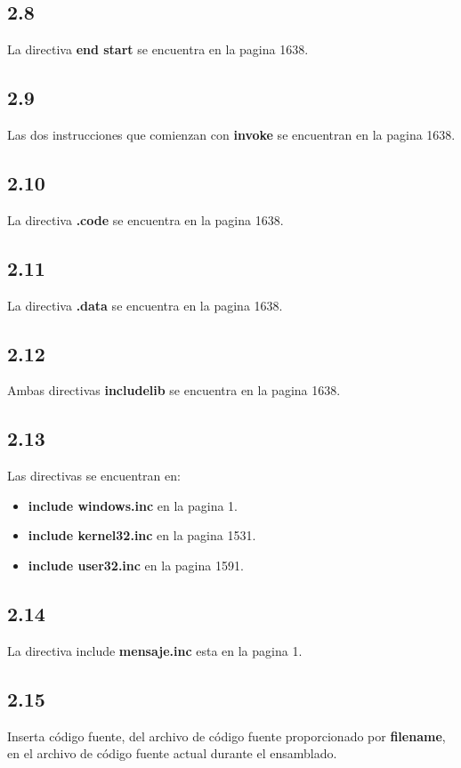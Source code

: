 \subsection*{2.8}
La directiva \textbf{end start} se encuentra en la pagina 1638.

\subsection*{2.9}
Las dos instrucciones que comienzan con \textbf{invoke} se encuentran en la pagina 1638.

\subsection*{2.10}
La directiva \textbf{.code} se encuentra en la pagina 1638.

\subsection*{2.11}
La directiva \textbf{.data} se encuentra en la pagina 1638.

\subsection*{2.12}
Ambas directivas \textbf{includelib} se encuentra en la pagina 1638.

\subsection*{2.13}
Las directivas se encuentran en:

\begin{itemize}
    \item \textbf{include windows.inc} en la pagina 1.
    \item \textbf{include kernel32.inc} en la pagina 1531.
    \item \textbf{include user32.inc} en la pagina 1591.
\end{itemize}

\subsection*{2.14}
La directiva include \textbf{mensaje.inc} esta en la pagina 1.

\subsection*{2.15}
Inserta código fuente, del archivo de código fuente proporcionado por
\textbf{filename}, en el archivo de código fuente actual durante el ensamblado.


